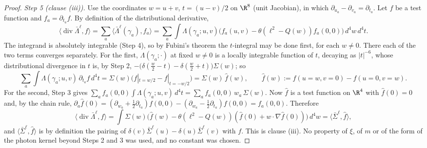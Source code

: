 \begin{proof}
\emph{Step 5 (clause (iii)).} Use the coordinates $w = u + v$, $t = (u - v)/2$ on $\R^{8}$ (unit Jacobian), in which $\partial_{u_{a}} - \partial_{v_{a}} = \partial_{t_{a}}$. Let $f$ be a test function and $f_{a} = \partial_{t_{a}}f$. By definition of the distributional derivative,
\[
\langle\operatorname{div}\bar\Lambda^{\ell},f\rangle = \sum_{a}\langle\bar\Lambda^{\ell}(\gamma_{a}),f_{a}\rangle = \sum_{a}\int\Lambda(\gamma_{a};u,v)\big(f_{a}(u,v) - \theta(\ell^{2} - Q(w))f_{a}(0,0)\big)\,d^{4}w\,d^{4}t .
\]
The integrand is absolutely integrable (Step 4), so by Fubini's theorem the $t$-integral may be done first, for each $w \neq 0$. There each of the two terms converges separately. For the first, $\Lambda(\gamma_{a};\cdot)$ at fixed $w \neq 0$ is a locally integrable function of $t$, decaying as $|t|^{-6}$, whose distributional divergence in $t$ is, by Step 2, $-\big(\delta(\tfrac{w}{2}-t) - \delta(\tfrac{w}{2}+t)\big)\Sigma(w)$; so
\[
\sum_{a}\int\Lambda(\gamma_{a};u,v)\,\partial_{t_{a}}f\,d^{4}t = \Sigma(w)\big(f|_{t = w/2} - f|_{t = -w/2}\big) = \Sigma(w)\,\hat f(w), \qquad \hat f(w) := f(u{=}w,v{=}0) - f(u{=}0,v{=}w).
\]
For the second, Step 3 gives $\sum_{a}f_{a}(0,0)\int\Lambda(\gamma_{a};u,v)\,d^{4}t = \sum_{a}f_{a}(0,0)\,w_{a}\,\Sigma(w)$. Now $\hat f$ is a test function on $\R^{4}$ with $\hat f(0) = 0$ and, by the chain rule, $\partial_{a}\hat f(0) = (\partial_{w_{a}} + \tfrac12\partial_{t_{a}})f(0,0) - (\partial_{w_{a}} - \tfrac12\partial_{t_{a}})f(0,0) = f_{a}(0,0)$. Therefore
\[
\langle\operatorname{div}\bar\Lambda^{\ell},f\rangle = \int\Sigma(w)\big(\hat f(w) - \theta(\ell^{2} - Q(w))(\hat f(0) + w\cdot\nabla\hat f(0))\big)\,d^{4}w = \langle\bar\Sigma^{\ell},\hat f\rangle ,
\]
and $\langle\bar\Sigma^{\ell},\hat f\rangle$ is by definition the pairing of $\delta(v)\bar\Sigma^{\ell}(u) - \delta(u)\bar\Sigma^{\ell}(v)$ with $f$. This is clause (iii). No property of $\xi$, of $m$ or of the form of the photon kernel beyond Steps 2 and 3 was used, and no constant was chosen.


\end{proof}
